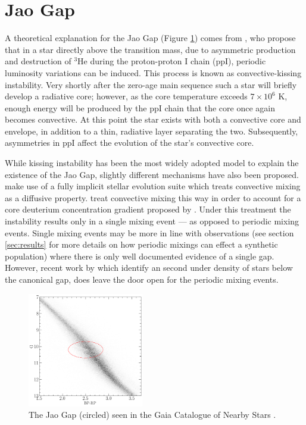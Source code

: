 \section{Jao Gap}\label{sec:JaoGap}
A theoretical explanation for the Jao Gap (Figure \ref{fig:JaoGap}) comes from
\citet{van2012}, who propose that in a star directly above the transition mass,
due to asymmetric production and destruction of $^{3}$He during the
proton-proton I chain (ppI), periodic luminosity variations can be induced.
This process is known as convective-kissing instability. Very shortly after the
zero-age main sequence such a star will briefly develop a radiative core;
however, as the core temperature exceeds $7\times 10^{6}$ K, enough energy will
be produced by the ppI chain that the core once again becomes convective. At
this point the star exists with both a convective core and envelope, in
addition to a thin, radiative layer separating the two. Subsequently,
asymmetries in ppI affect the evolution of the star's convective core.

While kissing instability has been the most widely adopted model to
explain the existence of the Jao Gap, slightly different mechanisms have also
been proposed. \citet{MacDonald2018} make use of a fully implicit stellar
evolution suite which treats convective mixing as a diffusive property.
\citeauthor{MacDonald2018} treat convective mixing this way in order to account
for a core deuterium concentration gradient proposed by \citet{Baraffe1997}.
Under this treatment the instability results only in a single mixing event ---
as opposed to periodic mixing events. Single mixing events may be more in line with
observations (see section \ref{sec:results} for more details on how periodic
mixings can effect a synthetic population) where there is only well documented
evidence of a single gap. However, recent work by \citet{Jao2021} which
identify an second under density of stars below the canonical gap, does leave
the door open for the periodic mixing events.

\begin{figure}
	\centering
	\includegraphics[width=0.45\textwidth]{JaoGapEDR3.png}
	\caption{The Jao Gap (circled) seen in the Gaia Catalogue of Nearby Stars \citep{GaiaCollaboration2021}.}
	\label{fig:JaoGap}
\end{figure}

